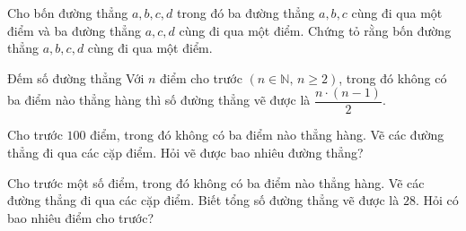 \begin{vd}
{	\begin{enumEX}{4}
		\item \hinha
		\item \hinhb
		\item \hinhc
		\item \hinhd
	\end{enumEX}

}
\end{vd}
\begin{vd}
	Cho bốn đường thẳng $  a, b, c, d $ trong đó ba đường thẳng $ a, b, c $ cùng đi qua một điểm và ba đường thẳng $ a, c, d $ cùng đi qua một điểm. Chứng tỏ rằng bốn đường thẳng $ a, b, c, d $ cùng đi qua một điểm.
\end{vd}

\begin{dang}{Đếm số đường thẳng}
	Với $ n $ điểm cho trước $ (n \in \mathbb{N},\, n \geq 2)$, trong đó không có ba điểm nào thẳng hàng thì số đường thẳng vẽ được là $ \dfrac{n\cdot (n-1)}{2} $.
\end{dang}
\begin{vd}
	Cho trước $ 100 $ điểm, trong đó không có ba điểm nào thẳng hàng. Vẽ các đường thẳng đi qua các cặp điểm. Hỏi vẽ được bao nhiêu đường thẳng?
\end{vd}
\begin{vd}
	Cho trước một số điểm, trong đó không có ba điểm nào thẳng hàng. Vẽ các đường thẳng đi qua các cặp điểm. Biết tổng số đường thẳng vẽ được là $ 28 $. Hỏi có bao nhiêu điểm cho trước?
\end{vd}

